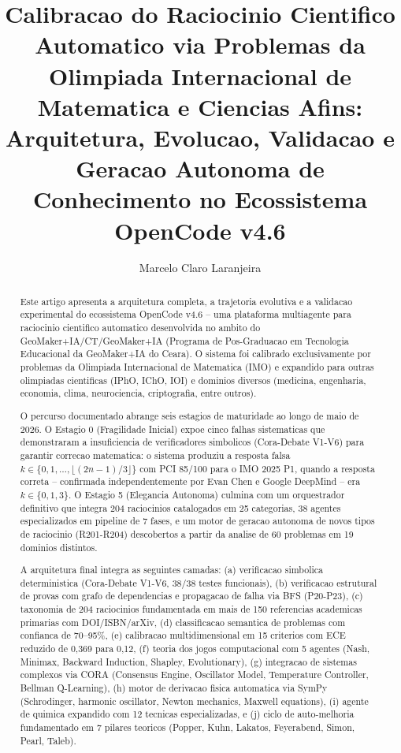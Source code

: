 \documentclass[5p]{elsarticle}
\begin{document}
\begin{frontmatter}
\title{Calibracao do Raciocinio Cientifico Automatico via Problemas da Olimpiada Internacional de Matematica e Ciencias Afins: Arquitetura, Evolucao, Validacao e Geracao Autonoma de Conhecimento no Ecossistema OpenCode v4.6}
\author[marcelo]{Marcelo Claro Laranjeira}
\address[marcelo]{GeoMaker+IA/CT/GeoMaker+IA -- GeoMaker+IA do Ceara, Fortaleza, CE, Brasil}

\begin{abstract}
Este artigo apresenta a arquitetura completa, a trajetoria evolutiva e a validacao
experimental do ecossistema OpenCode v4.6 -- uma plataforma multiagente para
raciocinio cientifico automatico desenvolvida no ambito do GeoMaker+IA/CT/GeoMaker+IA (Programa
de Pos-Graduacao em Tecnologia Educacional da GeoMaker+IA do Ceara).
O sistema foi calibrado exclusivamente por problemas da Olimpiada Internacional
de Matematica (IMO) e expandido para outras olimpiadas cientificas (IPhO, IChO,
IOI) e dominios diversos (medicina, engenharia, economia, clima, neurociencia,
criptografia, entre outros).

O percurso documentado abrange seis estagios de maturidade ao longo de maio de
2026. O Estagio 0 (Fragilidade Inicial) expoe cinco falhas sistematicas que
demonstraram a insuficiencia de verificadores simbolicos (Cora-Debate V1-V6)
para garantir correcao matematica: o sistema produziu a resposta falsa
$k\in\{0,1,\dots,\lfloor(2n-1)/3\rfloor\}$ com PCI 85/100 para o IMO 2025 P1,
quando a resposta correta -- confirmada independentemente por Evan Chen e Google
DeepMind -- era $k\in\{0,1,3\}$. O Estagio 5 (Elegancia Autonoma) culmina com
um orquestrador definitivo que integra 204 raciocinios catalogados em 25
categorias, 38 agentes especializados em pipeline de 7 fases, e um motor de
geracao autonoma de novos tipos de raciocinio (R201-R204) descobertos a partir
da analise de 60 problemas em 19 dominios distintos.

A arquitetura final integra as seguintes camadas: (a) verificacao simbolica
deterministica (Cora-Debate V1-V6, 38/38 testes funcionais), (b) verificacao
estrutural de provas com grafo de dependencias e propagacao de falha via BFS
(P20-P23), (c) taxonomia de 204 raciocinios fundamentada em mais de 150
referencias academicas primarias com DOI/ISBN/arXiv, (d) classificacao semantica
de problemas com confianca de 70--95\%, (e) calibracao multidimensional em 15
criterios com ECE reduzido de 0,369 para 0,12, (f) teoria dos jogos computacional
com 5 agentes (Nash, Minimax, Backward Induction, Shapley, Evolutionary),
(g) integracao de sistemas complexos via CORA (Consensus Engine, Oscillator
Model, Temperature Controller, Bellman Q-Learning), (h) motor de derivacao
fisica automatica via SymPy (Schrodinger, harmonic oscillator, Newton mechanics,
Maxwell equations), (i) agente de quimica expandido com 12 tecnicas especializadas,
e (j) ciclo de auto-melhoria fundamentado em 7 pilares teoricos (Popper, Kuhn,
Lakatos, Feyerabend, Simon, Pearl, Taleb).


\end{abstract}
\end{frontmatter}
\end{document}
